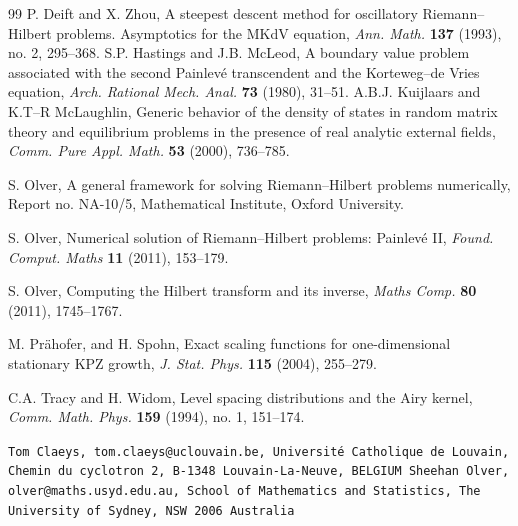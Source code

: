 \documentclass[11pt,fleqn]{article}
\numberwithin{equation}{section}
\begin{document}
\begin{thebibliography}{99}
        P. Deift and X. Zhou,
        A steepest descent method for oscillatory Riemann--Hilbert problems.
            Asymptotics for the MKdV equation,
        {\em Ann. Math.} {\bf 137} (1993), no. 2, 295--368.
    S.P. Hastings and J.B. McLeod,
    A boundary value problem associated with the second Painlev\'e transcendent
    and the Korteweg--de Vries equation,
    {\em Arch. Rational Mech. Anal.} {\bf 73} (1980), 31--51.
    A.B.J. Kuijlaars and K.T--R McLaughlin,
    Generic behavior of the density of states in random matrix theory
    and equilibrium problems in the presence of real analytic external
    fields,
    {\em Comm. Pure Appl. Math.} {\bf 53} (2000), 736--785.

    S. Olver,
    A general framework for solving Riemann--Hilbert problems numerically,
    Report no. NA-10/5, Mathematical Institute, Oxford University.

    S. Olver,
    Numerical solution of Riemann--Hilbert problems: Painlev\'e II,
    {\em Found. Comput. Maths} {\bf 11} (2011), 153--179.

    S. Olver,
     Computing the Hilbert transform and its inverse,
    {\em Maths Comp.} {\bf 80} (2011), 1745--1767.

    M. Pr{\"a}hofer, and H. Spohn,
    Exact scaling functions for one-dimensional stationary KPZ growth,
    {\em J. Stat. Phys.}  {\bf 115} (2004), 255--279.


        C.A. Tracy and H. Widom,
        Level spacing distributions and the Airy kernel,
        {\em Comm. Math. Phys.} {\bf 159} (1994), no. 1, 151--174.

\end{thebibliography}


\obeylines \texttt{Tom Claeys, tom.claeys@uclouvain.be, Universit\'e
Catholique de Louvain, Chemin du cyclotron 2, B-1348
Louvain-La-Neuve, BELGIUM
\medskip
Sheehan Olver, olver@maths.usyd.edu.au, School of Mathematics and
Statistics, The University of Sydney, NSW 2006 Australia }
\end{document}
